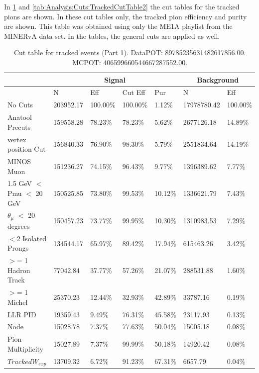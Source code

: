 In \ref{tab:Analysis:Cuts:TrackedCutTable1} and \ref{tab:Analysis:Cuts:TrackedCutTable2} the cut tables for the tracked pions are shown. In these cut tables only, the tracked pion efficiency and purity are shown. This table was obtained using only the ME1A playlist from the MINERvA data set. In the tables, the general cuts are applied as well. 

\begin{table}[!hbt]
    \tiny
    \centering
    \begin{tabular}{|*{7}{l|}}


    \hline
    & \multicolumn{4}{c|}{Signal} & \multicolumn{2}{c|}{Background} \\
    \hline
& N     & Eff     & Cut Eff & Pur    & N         & Eff  \\\hline

 No Cuts   & 203952.17     & 100.00\% & 100.00\% &   1.12\% & 17978780.42 & 100.00\% \\ \hline
 Anatool Precuts   & 159558.28     &  78.23\% &  78.23\% &   5.62\% & 2677126.18 &  14.89\%  \\ \hline
 vertex position Cut   & 156840.33     &  76.90\% &  98.30\% &   5.79\% & 2551834.64 &  14.19\%  \\ \hline
 MINOS Muon   & 151236.27     &  74.15\% &  96.43\% &   9.77\% & 1396389.62 &   7.77\%  \\ \hline
 1.5 GeV $<$ Pmu $<$ 20 GeV   & 150525.85     &  73.80\% &  99.53\% &  10.12\% & 1336621.79 &   7.43\%  \\ \hline
 $\theta_{\mu}$ $<$ 20 degrees   & 150457.23     &  73.77\% &  99.95\% &  10.30\% & 1310983.53 &   7.29\%  \\ \hline
 $<$2 Isolated Prongs   & 134544.17     &  65.97\% &  89.42\% &  17.94\% & 615463.26 &   3.42\%  \\ \hline
 $>$= 1 Hadron Track   & 77042.84     &  37.77\% &  57.26\% &  21.07\% & 288531.88 &   1.60\% \\ \hline
 $>$= 1 Michel   & 25370.23     &  12.44\% &  32.93\% &  42.89\% & 33787.16 &   0.19\% \\ \hline
 LLR PID   & 19359.43     &   9.49\% &  76.31\% &  45.58\% & 23117.93 &   0.13\% \\ \hline
 Node   & 15028.78     &   7.37\% &  77.63\% &  50.04\% & 15005.18 &   0.08\% \\ \hline
 Pion Multiplicity   & 15027.89     &   7.37\% &  99.99\% &  50.18\% & 14920.42 &   0.08\% \\ \hline
 $Tracked W_{exp}$   & 13709.32     &   6.72\% &  91.23\% &  67.31\% & 6657.79 &   0.04\% \\ \hline
    \end{tabular}
    \caption{Cut table for tracked events (Part 1). DataPOT: 89785235631482617856.00. MCPOT: 406599660544667287552.00.}
    \label{tab:Analysis:Cuts:TrackedCutTable1}
\end{table}

